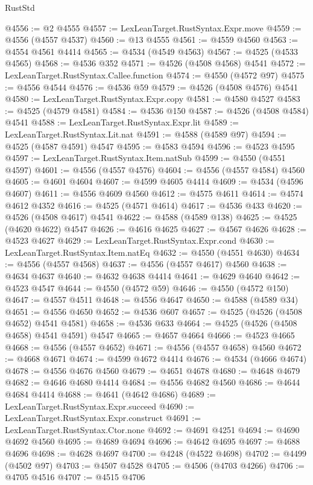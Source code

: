 \begin{lexlean}{RustStd}
\begin{coremodule}
{\begin{coremodule}
{{{{{{{{{{{{{{{{{{{{{{{{{{{{{{{{{{{{{{{{{{{{{{{{{{{{{{{@4556 := @2 @4555
@4557 := LexLeanTarget.RustSyntax.Expr.move
@4559 := @4556 (@4557 @4537)
@4560 := @13 @4555
@4561 := @4559 @4560
@4563 := @4554 @4561 @4414
@4565 := @4534 (@4549 @4563)
@4567 := @4525 (@4533 @4565)
@4568 := @4536 @352
@4571 := @4526 (@4508 @4568) @4541
@4572 := LexLeanTarget.RustSyntax.Callee.function
@4574 := @4550 (@4572 @97)
@4575 := @4556 @4544
@4576 := @4536 @59
@4579 := @4526 (@4508 @4576) @4541
@4580 := LexLeanTarget.RustSyntax.Expr.copy
@4581 := @4580 @4527
@4583 := @4525 (@4579 @4581)
@4584 := @4536 @150
@4587 := @4526 (@4508 @4584) @4541
@4588 := LexLeanTarget.RustSyntax.Expr.lit
@4589 := LexLeanTarget.RustSyntax.Lit.nat
@4591 := @4588 (@4589 @97)
@4594 := @4525 (@4587 @4591) @4547
@4595 := @4583 @4594
@4596 := @4523 @4595
@4597 := LexLeanTarget.RustSyntax.Item.natSub
@4599 := @4550 (@4551 @4597)
@4601 := @4556 (@4557 @4576)
@4604 := @4556 (@4557 @4584) @4560
@4605 := @4601 @4604
@4607 := @4599 @4605 @4414
@4609 := @4534 (@4596 @4607)
@4611 := @4556 @4609 @4560
@4612 := @4575 @4611
@4614 := @4574 @4612 @4352
@4616 := @4525 (@4571 @4614)
@4617 := @4536 @433
@4620 := @4526 (@4508 @4617) @4541
@4622 := @4588 (@4589 @138)
@4625 := @4525 (@4620 @4622) @4547
@4626 := @4616 @4625
@4627 := @4567 @4626
@4628 := @4523 @4627
@4629 := LexLeanTarget.RustSyntax.Expr.cond
@4630 := LexLeanTarget.RustSyntax.Item.natEq
@4632 := @4550 (@4551 @4630)
@4634 := @4556 (@4557 @4568)
@4637 := @4556 (@4557 @4617) @4560
@4638 := @4634 @4637
@4640 := @4632 @4638 @4414
@4641 := @4629 @4640
@4642 := @4523 @4547
@4644 := @4550 (@4572 @59)
@4646 := @4550 (@4572 @150)
@4647 := @4557 @4511
@4648 := @4556 @4647
@4650 := @4588 (@4589 @34)
@4651 := @4556 @4650
@4652 := @4536 @607
@4657 := @4525 (@4526 (@4508 @4652) @4541 @4581)
@4658 := @4536 @633
@4664 := @4525 (@4526 (@4508 @4658) @4541 @4591) @4547
@4665 := @4657 @4664
@4666 := @4523 @4665
@4668 := @4556 (@4557 @4652)
@4671 := @4556 (@4557 @4658) @4560
@4672 := @4668 @4671
@4674 := @4599 @4672 @4414
@4676 := @4534 (@4666 @4674)
@4678 := @4556 @4676 @4560
@4679 := @4651 @4678
@4680 := @4648 @4679
@4682 := @4646 @4680 @4414
@4684 := @4556 @4682 @4560
@4686 := @4644 @4684 @4414
@4688 := @4641 (@4642 @4686)
@4689 := LexLeanTarget.RustSyntax.Expr.succeed
@4690 := LexLeanTarget.RustSyntax.Expr.construct
@4691 := LexLeanTarget.RustSyntax.Ctor.none
@4692 := @4691 @4251
@4694 := @4690 @4692 @4560
@4695 := @4689 @4694
@4696 := @4642 @4695
@4697 := @4688 @4696
@4698 := @4628 @4697
@4700 := @4248 (@4522 @4698)
@4702 := @4499 (@4502 @97)
@4703 := @4507 @4528
@4705 := @4506 (@4703 @4266)
@4706 := @4705 @4516
@4707 := @4515 @4706
}}}}}}}}}}}}}}}}}}}}}}}}}}}}}}}}}}}}}}}}}}}}}}}}}}}}}}}
\end{coremodule}}
\end{coremodule}
\end{lexlean}

